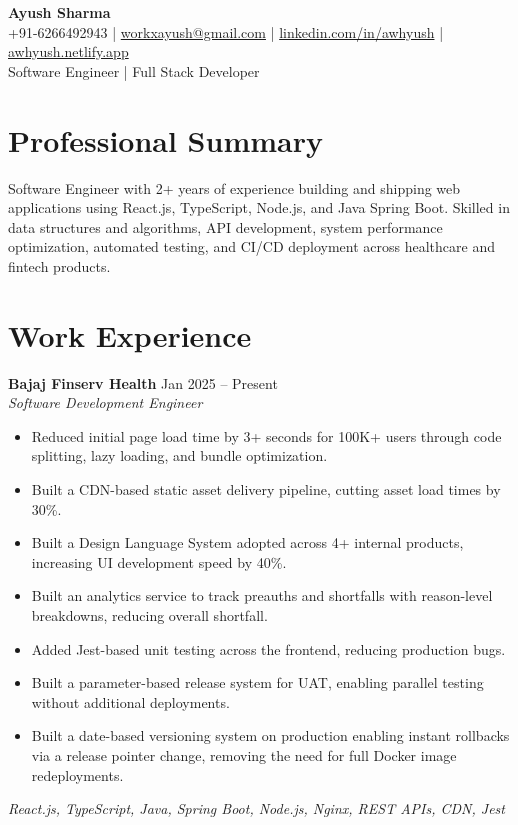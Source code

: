\documentclass[10.5pt,letterpaper]{article}
\newcommand{\resumeItem}[1]{\item[--] #1}
\newenvironment{resumeItemize}{\begin{itemize}[leftmargin=*,itemsep=1pt,topsep=2pt,parsep=0pt]}{\end{itemize}}
\begin{document}
\begin{center}
    {\LARGE \textbf{Ayush Sharma}}\\[3pt]
    +91-6266492943 \quad|\quad
    \href{mailto:workxayush@gmail.com}{workxayush@gmail.com} \quad|\quad
    \href{https://linkedin.com/in/awhyush}{linkedin.com/in/awhyush} \quad|\quad
    \href{https://awhyush.netlify.app}{awhyush.netlify.app}\\[1pt]
    Software Engineer | Full Stack Developer
\end{center}

\section*{Professional Summary}
Software Engineer with 2+ years of experience building and shipping web applications using React.js, TypeScript, Node.js, and Java Spring Boot. Skilled in data structures and algorithms, API development, system performance optimization, automated testing, and CI/CD deployment across healthcare and fintech products.

\section*{Work Experience}

\textbf{Bajaj Finserv Health} \hfill Jan 2025 -- Present \\
\textit{Software Development Engineer}
\begin{resumeItemize}
    \resumeItem{Reduced initial page load time by 3+ seconds for 100K+ users through code splitting, lazy loading, and bundle optimization.}
    \resumeItem{Built a CDN-based static asset delivery pipeline, cutting asset load times by 30\%.}
    \resumeItem{Built a Design Language System adopted across 4+ internal products, increasing UI development speed by 40\%.}
    \resumeItem{Built an analytics service to track preauths and shortfalls with reason-level breakdowns, reducing overall shortfall.}
    \resumeItem{Added Jest-based unit testing across the frontend, reducing production bugs.}
    \resumeItem{Built a parameter-based release system for UAT, enabling parallel testing without additional deployments.}
    \resumeItem{Built a date-based versioning system on production enabling instant rollbacks via a release pointer change, removing the need for full Docker image redeployments.}
\end{resumeItemize}
\textit{\small React.js, TypeScript, Java, Spring Boot, Node.js, Nginx, REST APIs, CDN, Jest}
\end{document}
